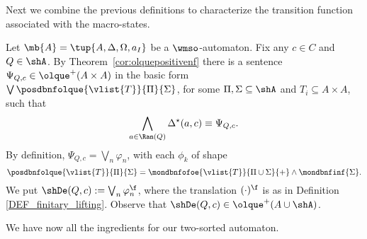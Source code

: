  Next we combine the previous definitions to characterize the transition function associated with the macro-states.
\begin{definition}\label{PROP_DeltaPowerset}
Let $\mb{A} = \tup{A,\Delta,\Omega,a_I}$ be a $\wmso$-automaton. Fix any $c \in C$ and $Q \in \shA$. By Theorem~\ref{cor:olquepositivenf} there is a sentence $\Psi_{Q,c} \in {\olque}^+(A\times A)$ in the basic form $\bigvee \posdbnfolque{\vlist{T}}{\Pi}{\Sigma}$, for some $\Pi,\Sigma \subseteq \shA$ and $T_i \subseteq A \times A$, such that
$$\bigwedge_{a \in \Ran(Q)} \Delta^{\star}(a,c) \equiv \Psi_{Q,c}.$$
By definition, $\Psi_{Q,c} = \bigvee_{n}\varphi_n$, with each $\phi_{k}$ of shape
%
$$\posdbnfolque{\vlist{T}}{\Pi}{\Sigma} = \mondbnfofoe{\vlist{T}}{\Pi \cup \Sigma}{+} \land
\mondbnfinf{\Sigma}.$$
%
We put $\shDe(Q,c) := \bigvee_{n}\varphi_n^{\f}$, where the translation $(\cdot)^{\f}$ is as in Definition \ref{DEF_finitary_lifting}. Observe that $\shDe(Q,c) \in {\olque}^+(A \cup \shA)$.
\end{definition}

\noindent We have now all the ingredients for our two-sorted automaton.

